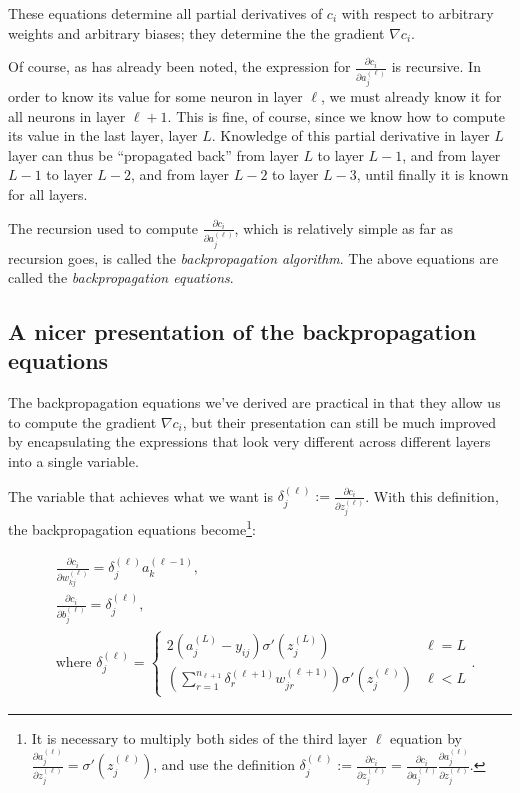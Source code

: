 \documentclass{article}
\begin{document}
	These equations determine all partial derivatives of $c_i$ with respect to arbitrary weights and arbitrary biases; they determine the the gradient $\nabla c_i$.
	
	Of course, as has already been noted, the expression for $\frac{\partial c_i}{\partial a^{(\ell)}_j}$ is recursive. In order to know its value for some neuron in layer $\ell$, we must already know it for all neurons in layer $\ell + 1$. This is fine, of course, since we know how to compute its value in the last layer, layer $L$. Knowledge of this partial derivative in layer $L$ layer can thus be ``propagated back'' from layer $L$ to layer $L - 1$, and from layer $L - 1$ to layer $L - 2$, and from layer $L - 2$ to layer $L - 3$, until finally it is known for all layers.
	
	The recursion used to compute $\frac{\partial c_i}{\partial a^{(\ell)}_j}$, which is relatively simple as far as recursion goes, is called the \textit{backpropagation algorithm}. The above equations are called the \textit{backpropagation equations}.
	
	\subsection*{A nicer presentation of the backpropagation equations}
	
	The backpropagation equations we've derived are practical in that they allow us to compute the gradient $\nabla c_i$, but their presentation can still be much improved by encapsulating the expressions that look very different across different layers into a single variable.
	
	The variable that achieves what we want is $\delta^{(\ell)}_j := \frac{\partial c_i}{\partial z^{(\ell)}_j}$. With this definition, the backpropagation equations become\footnote{It is necessary to multiply both sides of the third layer $\ell$ equation by $\frac{\partial a^{(\ell)}_j}{\partial z^{(\ell)}_j} = \sigma'(z^{(\ell)}_j)$, and use the definition $\delta^{(\ell)}_j := \frac{\partial c_i}{\partial z^{(\ell)}_j} = \frac{\partial c_i}{\partial a^{(\ell)}_j} \frac{\partial a^{(\ell)}_j}{\partial z^{(\ell)}_j}$.}:
	
	\begin{align*}
		&\frac{\partial c_i}{\partial w^{(\ell)}_{kj}} = \delta^{(\ell)}_j a^{(\ell - 1)}_k, \\
		&\frac{\partial c_i}{\partial b^{(\ell)}_j} = \delta^{(\ell)}_j, \\
		&\text{where } \delta^{(\ell)}_j =
		\begin{cases}
			2(a^{(L)}_j - y_{ij}) \sigma'(z^{(L)}_j) & \ell = L \\
			\left( \sum_{r = 1}^{n_{\ell+1}} \delta^{(\ell + 1)}_r w^{(\ell + 1)}_{jr} \right) \sigma'(z^{(\ell)}_j) & \ell < L
		\end{cases}.
	\end{align*}
	
\end{document}
